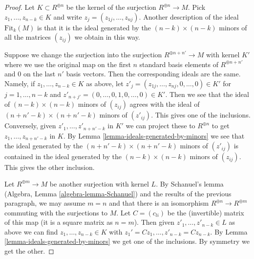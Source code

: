 \documentclass[10pt,a4paper]{amsart}
\theoremstyle{plain}
\theoremstyle{definition}
\theoremstyle{remark}
\numberwithin{equation}{subsection}
\begin{document}
\begin{proof}
Let $K \subset R^{\oplus n}$ be the kernel of the surjection
$R^{\oplus n} \to M$. Pick $z_1, \ldots, z_{n - k} \in K$
and write $z_j = (z_{1j}, \ldots, z_{nj})$.
Another description of the ideal $\text{Fit}_k(M)$
is that it is the ideal generated by the $(n - k) \times (n - k)$ minors of
all the matrices $(z_{ij})$ we obtain in this way.

\medskip\noindent
Suppose we change the surjection into the surjection
$R^{\oplus n + n'} \to M$ with kernel $K'$ where we use the original
map on the first $n$ standard basis elements of $R^{\oplus n + n'}$
and $0$ on the last $n'$ basis vectors. Then the corresponding ideals
are the same. Namely, if $z_1, \ldots, z_{n - k} \in K$ as above,
let $z'_j = (z_{1j}, \ldots, z_{nj}, 0, \ldots, 0) \in K'$ for
$j = 1, \ldots, n - k$ and
$z'_{n + j'} = (0, \ldots, 0, 1, 0, \ldots, 0) \in K'$. Then we see that
the ideal of $(n - k) \times (n - k)$ minors of $(z_{ij})$ agrees
with the ideal of $(n + n' - k) \times (n + n' - k)$ minors of
$(z'_{ij})$. This gives one of the inclusions.
Conversely, given  $z'_1, \ldots, z'_{n + n' - k}$
in $K'$ we can project these to $R^{\oplus n}$ to get
$z_1, \ldots, z_{n + n' - k}$ in $K$. By
Lemma \ref{lemma-ideals-generated-by-minors}
we see that the ideal generated by the
$(n + n' - k) \times (n + n' - k)$ minors of
$(z'_{ij})$ is contained in the ideal generated by the
$(n - k) \times (n - k)$ minors of $(z_{ij})$. This gives the
other inclusion.

\medskip\noindent
Let $R^{\oplus m} \to M$ be another surjection with kernel $L$.
By Schanuel's lemma (Algebra, Lemma \ref{algebra-lemma-Schanuel})
and the results of the previous paragraph, we may assume $m = n$
and that there is an isomorphism $R^{\oplus n} \to R^{\oplus m}$
commuting with the surjections to $M$. Let $C = (c_{li})$ be the
(invertible) matrix of this map (it is a square matrix as $n = m$).
Then given $z'_1, \ldots, z'_{n - k} \in L$ as above we can find
$z_1, \ldots, z_{n - k} \in K$ with
$z_1' = Cz_1, \ldots, z'_{n - k} = Cz_{n - k}$. By
Lemma \ref{lemma-ideals-generated-by-minors} we get one of the
inclusions. By symmetry we get the other.
\end{proof}
\end{document}

